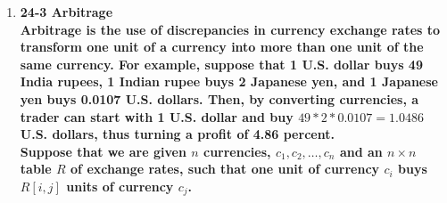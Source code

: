 \documentclass{article}
\begin{document}
\begin{enumerate}
\newpage
\item \textbf{ 24-3 Arbitrage } \\
\textbf{ Arbitrage is the use of discrepancies in currency exchange rates to transform one unit of a currency into more than one unit of the same currency. For example, suppose that 1 U.S. dollar buys 49 India rupees, 1 Indian rupee buys 2 Japanese yen, and 1 Japanese yen buys 0.0107 U.S. dollars. Then, by converting currencies, a trader can start with 1 U.S. dollar and buy $49 * 2 * 0.0107 = 1.0486$ U.S. dollars, thus turning a profit of 4.86 percent. } \\
\textbf{Suppose that we are given $n$ currencies, $c_1, c_2, \dots, c_n$ and an $n \times n$ table $R$ of exchange rates, such that one unit of currency $c_i$ buys $R[i,j]$ units of currency $c_j$.}

    





\end{enumerate}
\end{document}
